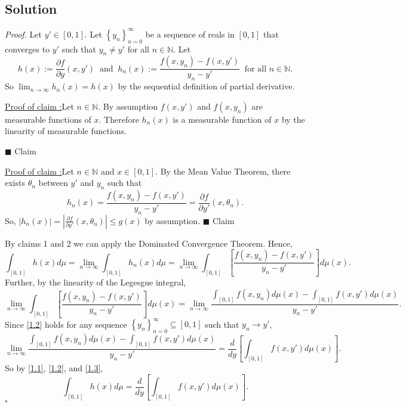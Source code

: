 \documentclass[12pt]{article}
\newcounter{ProofCounter}
\newcounter{ClaimCounter}[ProofCounter]
\newenvironment{Proof}{\stepcounter{ProofCounter}\textit{Proof.}}{\hfill$\square$}
\newenvironment{claim}[1]{\stepcounter{ClaimCounter}\par\noindent\underline{Claim \theClaimCounter:}\space#1}{}
\newenvironment{claimproof}[1]{\par\noindent\underline{Proof of claim \theClaimCounter:}\space#1}{\hfill $\blacksquare$ Claim \theClaimCounter\vspace{5mm}}
\begin{document}
\subsection*{Solution}
\begin{Proof}
Let $y' \in [0,1]$. Let $\left\{ y_{n} \right\}_{n=0}^{\infty}$ be a sequence of reals in $[0,1]$ that converges to $y'$ such that $y_{n} \neq y'$ for
all $n \in \mathbb{N}$. Let 
\[ h(x) := \frac{\partial f}{\partial y}(x,y') \ \text{ and }\ h_{n}(x):= \frac{f(x,y_{n}) - f(x,y')}{y_{n} - y'} \ \text{ for all }n \in \mathbb{N}. \]
So $\lim_{n\rightarrow \infty}h_{n}(x) = h(x)$ by the sequential definition of partial derivative. 

\begin{claimproof}
Let $n \in \mathbb{N}$. By assumption $f(x,y')$ and $f(x,y_{n})$ are measurable functions of $x$. Therefore $h_{n}(x)$ is a measurable function of $x$ 
by the linearity of measurable functions.

\end{claimproof}

\begin{claimproof}
Let $n \in \mathbb{N}$ and $x \in [0,1]$. By the Mean Value Theorem, there exists $\theta_{n}$ between $y'$ and $y_{n}$ such that 
\[ h_{n}(x) = \frac{f(x,y_{n}) - f(x,y')}{y_{n} - y'} = \frac{\partial f}{\partial y'}(x,\theta_{n}). \]
So, $|h_{n}(x)| = \left| \frac{\partial f}{\partial y'}(x,\theta_{n})\right| \leq g(x)$ by assumption.
\end{claimproof}

By claims 1 and 2 we can apply the Dominated Convergence Theorem. Hence, 
\begin{equation}
\int_{[0,1]}h(x)d\mu = \lim_{n\rightarrow\infty}\int_{[0,1]}h_{n}(x)d\mu = \lim_{n\rightarrow\infty}\int_{[0,1]}\left[ \frac{f(x,y_{n}) -
f(x,y')}{y_{n}-y'} \right]d\mu(x).
\label{1.1}
\end{equation} 
Further, by the linearity of the Legesgue integral,
\begin{equation}
\lim_{n\rightarrow\infty}\int_{[0,1]}\left[ \frac{f(x,y_{n}) - f(x,y')}{y_{n}-y'} \right]d\mu(x) = \lim_{n\rightarrow\infty} \frac{
\int_{[0,1]}f(x,y_{n})d\mu(x) - \int_{[0,1]}f(x,y')d\mu(x)}{y_{n} - y'}.
\label{1.2}
\end{equation}
Since \eqref{1.2} holds for any sequence $\left\{ y_{n} \right\}_{n=0}^{\infty} \subseteq [0,1]$ such that $y_{n} \rightarrow y'$,
\begin{equation}
\lim_{n\rightarrow\infty} \frac{ \int_{[0,1]}f(x,y_{n})d\mu(x) - \int_{[0,1]}f(x,y')d\mu(x)}{y_{n} - y'} = \frac{d}{dy}\left[ \int_{[0,1]}f(x,y')d\mu(x) \right]. 
\label{1.3}
\end{equation}
So by \eqref{1.1}, \eqref{1.2}, and \eqref{1.3},
\[ \int_{[0,1]}h(x)d\mu = \frac{d}{dy}\left[ \int_{[0,1]}f(x,y')d\mu(x) \right]. \]
\end{Proof}
\end{document}
